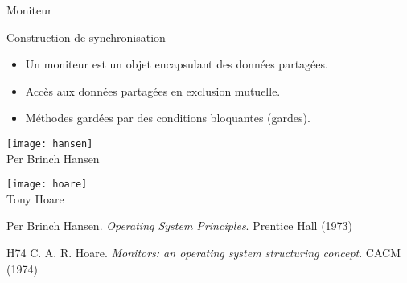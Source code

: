 
\begingroup

\begin{frame}{Moniteur}

  \vFill
  \begin{block}{Construction de synchronisation}
    \begin{itemize}
    \item Un moniteur est un objet encapsulant des données partagées.
    \item Accès aux données partagées en exclusion mutuelle.
    \item Méthodes gardées par des conditions bloquantes (gardes).
    \end{itemize}
  \end{block}

  \vFill
  \hFill
  \begin{minipage}{.4\textwidth}
    \begin{center}
      \texttt{[image: hansen]}\\
      Per Brinch Hansen
    \end{center}
  \end{minipage}
  \hFill
  \begin{minipage}{.5\textwidth}
    \begin{center}
      \texttt{[image: hoare]}\\
      Tony Hoare
    \end{center}
  \end{minipage}
  \hFill

  \vFill
  \begin{citing}
  \item[] Per Brinch Hansen. \textit{Operating System Principles}. Prentice Hall (1973)
  \item[H74] C. A. R. Hoare. \textit{Monitors: an operating system structuring concept}. CACM (1974)
  \end{citing}
\end{frame}

\endgroup
\endinput
